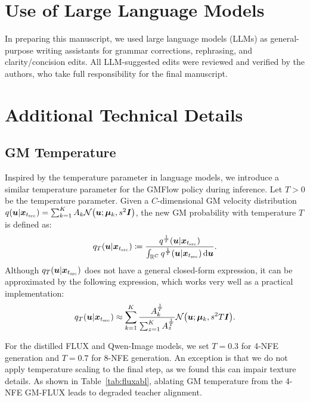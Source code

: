 \appendix




\section{Use of Large Language Models}

In preparing this manuscript, we used large language models (LLMs) as general-purpose writing assistants for grammar corrections, rephrasing, and clarity/concision edits. All LLM-suggested edits were reviewed and verified by the authors, who take full responsibility for the final manuscript.

\section{Additional Technical Details}

\subsection{GM Temperature}
\label{sec:gm_temp}
Inspired by the temperature parameter in language models, we introduce a similar temperature parameter for the GMFlow policy during inference. Let $T>0$ be the temperature parameter. Given a $C$-dimensional GM velocity distribution $q(\vu | \vx_{t_\text{src}}) = \sum_{k=1}^K A_{k} \mathcal{N}\left(\vu; \vmu_{k}, s^2\mI\right)$, the new GM probability with temperature $T$ is defined as:
\begin{align}
    q_T({\bm{u}} | {\bm{x}}_{t_\text{src}}) \coloneqq \frac{q^\frac{1}{T}({\bm{u}} | {\bm{x}}_{t_\text{src}})}{\int_{\mathbb{R}^C} q^\frac{1}{T}({\bm{u}} | {\bm{x}}_{t_\text{src}}) \mathop{}\!\mathrm{d} {\bm{u}}}.
\end{align}
Although $q_T({\bm{u}} | {\bm{x}}_{t_\text{src}})$ does not have a general closed-form expression, it can be approximated by the following expression, which works very well as a practical implementation:
\begin{align}
    q_T(\vu | \vx_{t_\text{src}}) \approx \sum_{k=1}^K \frac{A_{k}^\frac{1}{T}}{\sum_{z=1}^{K} A_{z}^\frac{1}{T}} \mathcal{N}\left(\vu; \vmu_{k}, s^2 T \mI\right).
\end{align}

For the distilled FLUX and Qwen-Image models, we set $T=0.3$ for 4-NFE generation and $T=0.7$ for 8-NFE generation. An exception is that we do not apply temperature scaling to the final step, as we found this can impair texture details. As shown in Table~\ref{tab:fluxabl}, ablating GM temperature from the 4-NFE GM-FLUX leads to degraded teacher alignment.

